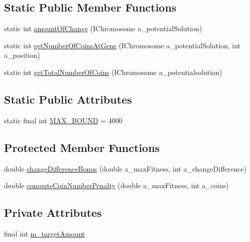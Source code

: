 \subsection*{Static Public Member Functions}
\begin{DoxyCompactItemize}
\item 
static int \hyperlink{classexamples_1_1_minimizing_fitness_function_cached_ae974ec638a7ca9f3b6452b02d7d718d7}{amount\-Of\-Change} (I\-Chromosome a\-\_\-potential\-Solution)
\item 
static int \hyperlink{classexamples_1_1_minimizing_fitness_function_cached_aeed7f62975dc3f9b2548ed66f604af2b}{get\-Number\-Of\-Coins\-At\-Gene} (I\-Chromosome a\-\_\-potential\-Solution, int a\-\_\-position)
\item 
static int \hyperlink{classexamples_1_1_minimizing_fitness_function_cached_a99606d90aa0cbb78318d5752df291f9c}{get\-Total\-Number\-Of\-Coins} (I\-Chromosome a\-\_\-potentialsolution)
\end{DoxyCompactItemize}
\subsection*{Static Public Attributes}
\begin{DoxyCompactItemize}
\item 
static final int \hyperlink{classexamples_1_1_minimizing_fitness_function_cached_a5ad11b92f0fb2a01accd4c532a40f192}{M\-A\-X\-\_\-\-B\-O\-U\-N\-D} = 4000
\end{DoxyCompactItemize}
\subsection*{Protected Member Functions}
\begin{DoxyCompactItemize}
\item 
double \hyperlink{classexamples_1_1_minimizing_fitness_function_cached_abed13dc59938722e114aef2bfcb47b33}{change\-Difference\-Bonus} (double a\-\_\-max\-Fitness, int a\-\_\-change\-Difference)
\item 
double \hyperlink{classexamples_1_1_minimizing_fitness_function_cached_a9f1fa9f8dd8ee3eff8f5facb05152e4f}{compute\-Coin\-Number\-Penalty} (double a\-\_\-max\-Fitness, int a\-\_\-coins)
\end{DoxyCompactItemize}
\subsection*{Private Attributes}
\begin{DoxyCompactItemize}
\item 
final int \hyperlink{classexamples_1_1_minimizing_fitness_function_cached_a38e378b14a375bcf4f70b9e7deb89eed}{m\-\_\-target\-Amount}
\end{DoxyCompactItemize}
